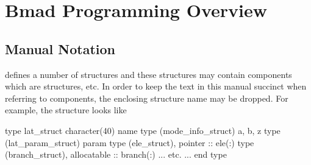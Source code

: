 \chapter{Bmad Programming Overview}
\label{c:programming}

\section{Manual Notation}
\label{s:component}

\bmad defines a number of structures and these structures may contain
components which are structures, etc. In order to keep the text in
this manual succinct when referring to components, the enclosing
structure name may be dropped. For example, the 
structure looks like
\begin{example}
  type lat_struct
    character(40) name               
    type (mode_info_struct) a, b, z  
    type (lat_param_struct) param    
    type (ele_struct), pointer ::  ele(:)
    type (branch_struct), allocatable :: branch(:)  
    ... etc. ...
  end type
\end{example}
